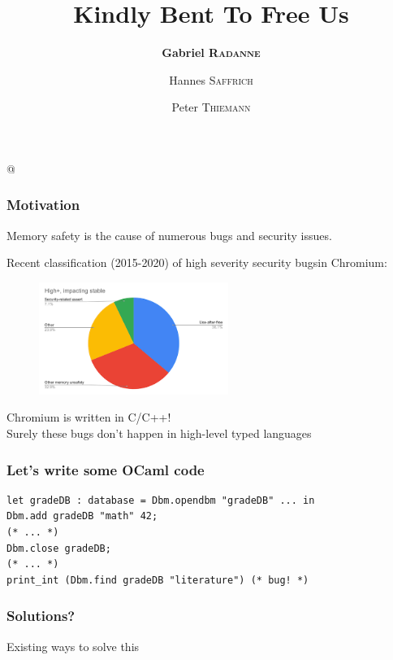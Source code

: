 \documentclass[aspectratio=169,dvipsnames,svgnames,10pt]{beamer}
\title{Kindly Bent To Free Us}
\author{\textbf{Gabriel \textsc{Radanne}}
  \and Hannes \textsc{Saffrich}
  \and Peter \textsc{Thiemann}}
\begin{document}
\lstMakeShortInline[keepspaces,basicstyle=\small\ttfamily]@

\frame[plain]{\titlepage}


\begin{frame}
  \frametitle{Motivation}

  Memory safety is the cause of numerous bugs and security issues.
  
  Recent classification (2015-2020) of \og high severity security bugs\fg in Chromium:

  \begin{figure}[h]
    \centering
    \includegraphics[width=0.55\textwidth]
    {chromium-use-after-free}
  \end{figure}

  \pause
  Chromium is written in C/C++!\\
  Surely these bugs don't happen in high-level typed languages
  
\end{frame}

\begin{frame}[fragile]
  \frametitle{Let's write some OCaml code}

\begin{verbatim}
let gradeDB : database = Dbm.opendbm "gradeDB" ... in
Dbm.add gradeDB "math" 42;
(* ... *)
Dbm.close gradeDB;
(* ... *)
print_int (Dbm.find gradeDB "literature") (* bug! *)
\end{verbatim}
  
\end{frame}

\begin{frame}
  \frametitle{Solutions?}

  Existing ways to solve this
  
\end{frame}
\end{document}
